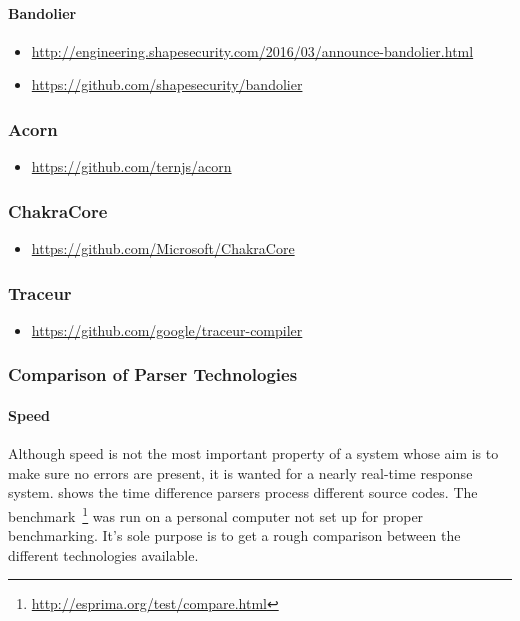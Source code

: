 \paragraph{Bandolier}
\begin{itemize}
	\item \url{http://engineering.shapesecurity.com/2016/03/announce-bandolier.html}
	\item \url{https://github.com/shapesecurity/bandolier}
\end{itemize}

\subsubsection{Acorn}
\begin{itemize}
	\item \url{https://github.com/ternjs/acorn}
\end{itemize}

\subsubsection{ChakraCore}
\begin{itemize}
	\item \url{https://github.com/Microsoft/ChakraCore}
\end{itemize}

\subsubsection{Traceur}
\begin{itemize}
	\item \url{https://github.com/google/traceur-compiler}
\end{itemize}

\subsubsection{Comparison of Parser Technologies}
\paragraph{Speed} Although speed is not the most important property of a system whose aim is to make sure no errors are present, it is wanted for a nearly real-time response system.  shows the time difference parsers process different source codes. The benchmark~\footnote{\url{http://esprima.org/test/compare.html}} was run on a personal computer not set up for proper benchmarking. It's sole purpose is to get a rough comparison between the different technologies available.

